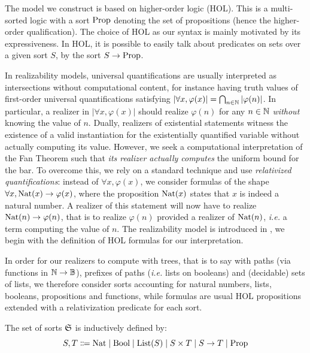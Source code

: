 \documentclass[a4paper,UKenglish,cleveref, autoref, thm-restate]{lipics-v2021}
\begin{document}
The model we construct is based on higher-order logic (HOL). This is a multi-sorted logic with a sort $\mathrm{Prop}$ denoting the set of propositions (hence the higher-order qualification).
The choice of HOL as our syntax is mainly motivated by its expressiveness. In HOL, it is possible to easily talk about predicates on sets over a given sort $S$, by the sort $S \to \mathrm{Prop}$. 


In realizability models, universal quantifications are usually interpreted as intersections without computational content, for instance having truth values of first-order universal quantifications satisfying $|\forall x,\varphi(x)|=\bigcap_{n\in\mathbb N}|\varphi(n)|$. In particular, a realizer in $|\forall x,\varphi(x)|$ should realize $\varphi(n)$ for any $n\in\mathbb N$ \emph{without} knowing the value of $n$. Dually, realizers of existential statements witness the existence of a valid instantiation for the existentially quantified variable without actually computing its value.
However, we seek a computational interpretation of the Fan Theorem such that \emph{its realizer actually computes} the uniform bound for the bar.
To overcome this, we rely on a standard technique and use \emph{relativized quantifications}: instead of $\forall x,\varphi(x)$, we consider
formulas of the shape $\forall x,\mathrm{Nat}(x) \to \varphi(x)$, where the proposition $\mathrm{Nat}(x)$ states that $x$ is indeed a natural number. A realizer of this statement will now have to realize  $\mathrm{Nat}(n)\to \varphi(n)$, that is to realize $\varphi(n)$ provided a realizer of $\mathrm{Nat}(n)$, \emph{i.e.} a term computing the value of $n$. The realizability model is introduced in , we begin with the definition of HOL formulas for our interpretation.

In order for our realizers to compute with trees, that is to say with paths (via functions in $\mathbb N\to\mathbb B$), prefixes of paths (\emph{i.e.} lists on booleans) and (decidable) sets of lists, we therefore consider sorts accounting for natural numbers, lists, booleans, propositions and functions, while formulas are usual HOL propositions extended with a relativization predicate for each sort.



\begin{definition}[Sorts]
  The set of sorts $\mathfrak S$ is inductively defined by:
  \[S,T \Coloneq \Nat \mid \Bool \mid \List(S)\mid S \times T \mid S \to T \mid \Prop\]
\end{definition}
\end{document}
